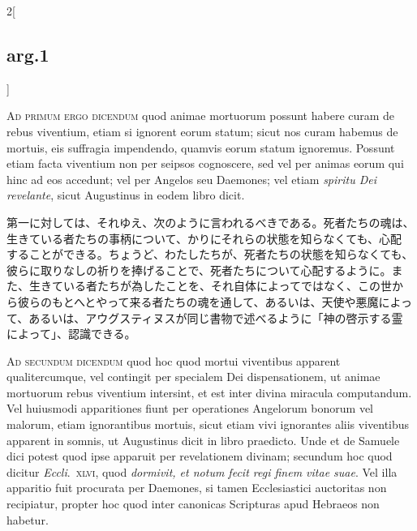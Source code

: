 \documentclass[paper=a4paper,fontsize=10pt,jafontsize=9pt,titlepage]{jlreq}
\begin{document}
\begin{paracol}{2}[\subsection{arg.1}]
\switchcolumn*[\subsection{ad.1}]

{\scshape Ad primum ergo dicendum} quod animae mortuorum possunt habere
curam de rebus viventium, etiam si ignorent eorum statum; sicut nos
curam habemus de mortuis, eis suffragia impendendo, quamvis eorum
statum ignoremus. Possunt etiam facta viventium non per seipsos
cognoscere, sed vel per animas eorum qui hinc ad eos accedunt; vel per
Angelos seu Daemones; vel etiam {\itshape spiritu Dei revelante}, sicut
Augustinus in eodem libro dicit.

\switchcolumn

第一に対しては、それゆえ、次のように言われるべきである。死者たちの魂は、
生きている者たちの事柄について、かりにそれらの状態を知らなくても、心配
することができる。ちょうど、わたしたちが、死者たちの状態を知らなくても、
彼らに取りなしの祈りを捧げることで、死者たちについて心配するように。ま
た、生きている者たちが為したことを、それ自体によってではなく、この世か
ら彼らのもとへとやって来る者たちの魂を通して、あるいは、天使や悪魔によっ
て、あるいは、アウグスティヌスが同じ書物で述べるように「神の啓示する霊
によって」、認識できる。

\switchcolumn*[\subsection{ad.2}]

{\scshape Ad secundum dicendum} quod hoc quod mortui viventibus apparent
qualitercumque, vel contingit per specialem Dei dispensationem, ut
animae mortuorum rebus viventium intersint, et est inter divina
miracula computandum.  Vel huiusmodi apparitiones fiunt per
operationes Angelorum bonorum vel malorum, etiam ignorantibus mortuis,
sicut etiam vivi ignorantes aliis viventibus apparent in somnis, ut
Augustinus dicit in libro praedicto.  Unde et de Samuele dici potest
quod ipse apparuit per revelationem divinam; secundum hoc quod dicitur
{\itshape Eccli}.~{\scshape xlvi}, quod {\itshape dormivit, et notum fecit regi finem
vitae suae}.  Vel illa apparitio fuit procurata per Daemones, si tamen
Ecclesiastici auctoritas non recipiatur, propter hoc quod inter
canonicas Scripturas apud Hebraeos non habetur.

\switchcolumn


\end{paracol}
\end{document}

